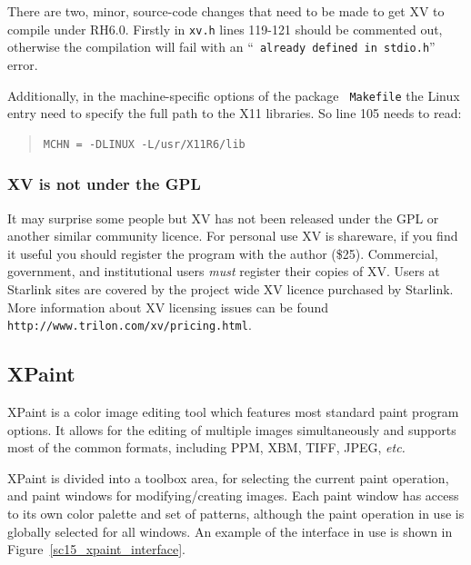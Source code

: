 \documentclass[twoside,11pt]{article}
\newcommand{\htmladdnormallink}[2]{#1}
\newcommand{\xlabel}[1]{}
\begin{document}
There are two, minor, source-code changes that need to be made to get
XV to compile under RH6.0. Firstly in {\tt xv.h} lines 119-121 should
be commented out, otherwise the compilation will fail with an ``{\tt
already defined in stdio.h}'' error. \normalsize

Additionally, in the machine-specific options of the package {\tt
Makefile} the Linux entry need to specify the full path to the X11
libraries. So line 105 needs to read:

\small
\begin{quote}
\begin{verbatim}
MCHN = -DLINUX -L/usr/X11R6/lib
\end{verbatim}
\end{quote}
\normalsize

\subsubsection{XV is {\bf not} under the GPL}

It may surprise some people but XV has not been released under the GPL
or another similar community licence. For personal use XV is
shareware, if you find it useful you should register the program with
the author (\$25). Commercial, government, and institutional users
{\em must} register their copies of XV. Users at Starlink sites are
covered by the project wide XV licence purchased by Starlink. More
information about XV licensing issues can be found
\htmladdnormallink{{\tt
http://www.trilon.com/xv/pricing.html}}{http://www.trilon.com/xv/pricing.html}.

\subsection{\xlabel{sc15_xpaint}XPaint\label{sc15_xpaint}}
 
\htmladdnormallink{XPaint}{http://home.worldonline.dk/~torsten/xpaint/}
is a color image editing tool which features most standard paint
program options. It allows for the editing of multiple images
simultaneously and supports most of the common formats, including PPM,
XBM, TIFF, JPEG, {\em etc.}

XPaint is divided into a toolbox area, for selecting the current paint
operation, and paint windows for modifying/creating images. Each paint
window has access to its own color palette and set of patterns,
although the paint operation in use is globally selected for all
windows. An example of the interface in use is shown in
Figure~\ref{sc15_xpaint_interface}.
\end{document}
